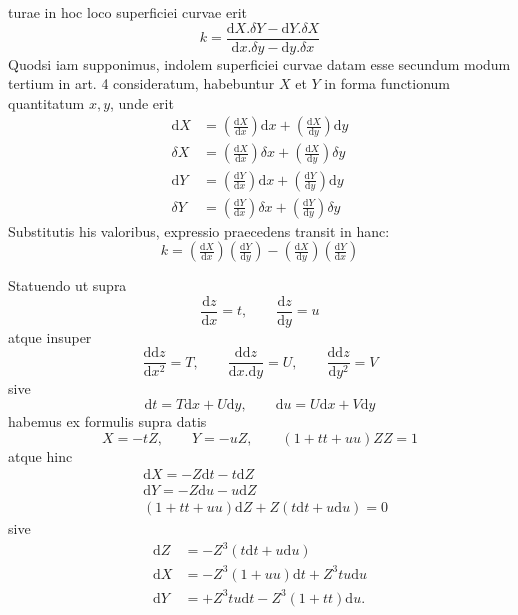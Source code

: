 %
turae in hoc loco superficiei curvae erit
\[
k=\frac{\mathrm{d}X\mathord{.}\delta Y-\mathrm{d}Y\mathord{.}\delta X}{\mathrm{d}x\mathord{.}\delta y-\mathrm{d}y\mathord{.}\delta x}
\]
Quodsi iam supponimus, indolem superficiei curvae datam esse secundum modum tertium in art. 4 consideratum, habebuntur \(X\) et \(Y\) in forma functionum quantitatum \(x,y\), unde erit
\[
\begin{aligned}
\mathrm{d}X&=(\tfrac{\mathrm{d}X}{\mathrm{d}x})\mathrm{d}x+(\tfrac{\mathrm{d}X}{\mathrm{d}y})\mathrm{d}y\\
\delta X&=(\tfrac{\mathrm{d}X}{\mathrm{d}x})\delta x+(\tfrac{\mathrm{d}X}{\mathrm{d}y})\delta y\\
\mathrm{d}Y&=(\tfrac{\mathrm{d}Y}{\mathrm{d}x})\mathrm{d}x+(\tfrac{\mathrm{d}Y}{\mathrm{d}y})\mathrm{d}y\\
\delta Y&=(\tfrac{\mathrm{d}Y}{\mathrm{d}x})\delta x+(\tfrac{\mathrm{d}Y}{\mathrm{d}y})\delta y
\end{aligned}
\]
Substitutis his valoribus, expressio praecedens transit in hanc:
\[
k=(\tfrac{\mathrm{d}X}{\mathrm{d}x})(\tfrac{\mathrm{d}Y}{\mathrm{d}y})-(\tfrac{\mathrm{d}X}{\mathrm{d}y})(\tfrac{\mathrm{d}Y}{\mathrm{d}x})
\]
\par\indent Statuendo ut supra
\[
\frac{\mathrm{d}z}{\mathrm{d}x}=t,\qquad\frac{\mathrm{d}z}{\mathrm{d}y}=u
\]
atque insuper
\[
\frac{\mathrm{d}\mathrm{d}z}{\mathrm{d}x^2}=T,\qquad\frac{\mathrm{d}\mathrm{d}z}{\mathrm{d}x\mathord{.}\mathrm{d}y}=U,\qquad\frac{\mathrm{d}\mathrm{d}z}{\mathrm{d}y^2}=V
\]
sive
\[
\mathrm{d}t=T\mathrm{d}x+U\mathrm{d}y,\qquad\mathrm{d}u=U\mathrm{d}x+V\mathrm{d}y
\]
habemus ex formulis supra datis
\[
X=-tZ,\qquad Y=-uZ,\qquad(1+tt+uu)ZZ=1
\]
atque hinc
\[
\begin{aligned}
&\mathrm{d}X=-Z\mathrm{d}t-t\mathrm{d}Z\\
&\mathrm{d}Y=-Z\mathrm{d}u-u\mathrm{d}Z\\
&(1+tt+uu)\mathrm{d}Z+Z(t\mathrm{d}t+u\mathrm{d}u)=0
\end{aligned}
\]
sive
\[
\begin{aligned}
\mathrm{d}Z&=-Z^3(t\mathrm{d}t+u\mathrm{d}u)\\
\mathrm{d}X&=-Z^3(1+uu)\mathrm{d}t+Z^3tu\mathrm{d}u\\
\mathrm{d}Y&=+Z^3tu\mathrm{d}t-Z^3(1+tt)\mathrm{d}u\mathord{.}
\end{aligned}
\]
